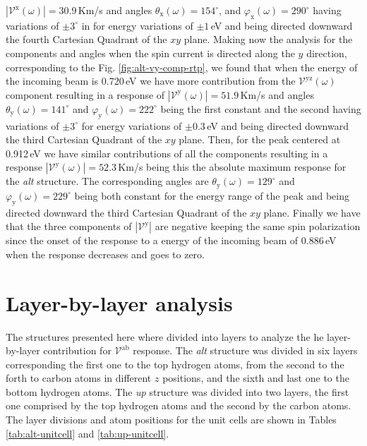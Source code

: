 \documentclass[prb,11pt,tightenlines,twocolumn,aps]{revtex4-1}
\begin{document}
$|\mathcal{V}^{\mathrm{x}}(\omega)|=30.9$\,Km/s and angles
$\theta_{\mathrm{x}}(\omega)=154^{\circ}$, and
$\varphi_{\mathrm{x}}(\omega)=290^{\circ}$ having variations of $\pm3^{\circ}$
in for energy variations of $\pm1$\,eV and being directed downward the fourth
Cartesian Quadrant of the $xy$ plane.
% 
Making now the analysis for the components and angles when the spin current is
directed along the $y$ direction, corresponding to the Fig.
% 
\ref{fig:alt-vy-comp-rtp}, we found that when the energy of the incoming beam is
0.720\,eV we have more contribution from the $\mathcal{V}^{\mathrm{yz}}(\omega)$
component resulting in a response of
$|\mathcal{V}^{\mathrm{y}}(\omega)|=51.9$\,Km/s and angles
$\theta_{\mathrm{y}}(\omega)=141^{\circ}$ and
$\varphi_{\mathrm{y}}(\omega)=222^{\circ}$ being the first constant and the
second having variations of $\pm3^{\circ}$ for energy variations of $\pm0.3$\,eV
and being directed downward the third Cartesian Quadrant of the $xy$ plane.
% 
Then, for the peak centered at 0.912\,eV we have similar contributions of all
the components resulting in a response
$|\mathcal{V}^{\mathrm{y}}(\omega)|=52.3$\,Km/s being this the absolute maximum
response for the \emph{alt} structure. The corresponding angles are
$\theta_{\mathrm{y}}(\omega)=129^{\circ}$ and
$\varphi_{\mathrm{y}}(\omega)=229^{\circ}$ being both constant for the energy
range of the peak and being directed downward the third Cartesian Quadrant of
the $xy$ plane.
% 
Finally we have that the three components of $|\mathcal{V}^{\mathrm{y}}|$ are
negative keeping the same spin polarization since the onset of the response to a
energy of the incoming beam of 0.886\,eV when the response decreases and goes to
zero.


\section{Layer-by-layer analysis} %
\label{sec:res-layer_by_layer_analysis}

The structures presented here where divided into layers to analyze the he
layer-by-layer contribution for $\mathcal{V}^{\mathrm{ab}}$ response. The
\emph{alt} structure was divided in six layers corresponding the first one to
the top hydrogen atoms, from the second to the forth to carbon atoms in
different $z$ positions, and the sixth and last one to the bottom hydrogen
atoms. The \emph{up} structure was divided into two layers, the first one
comprised by the top hydrogen atoms and the second by the carbon atoms. The
layer divisions and atom positions for the unit cells are shown in Tables
\ref{tab:alt-unitcell} and \ref{tab:up-unitcell}.
\end{document}
